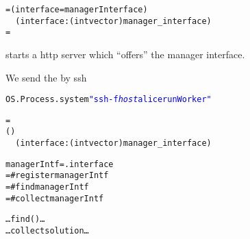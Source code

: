 \documentclass[a4,12pt]{seminar}
\begin{document}
\begin{slide}

\begin{alltt}
\footnotesize
{}  =  ( interface = managerInterface)
                \cdi{:>} \,\,( interface : (int vector) manager_interface)
     =  
\end{alltt}

\vskip 10mm

\begin{dinglist}{\dingA}
\item {} starts a http server which ``offers'' the manager interface.

\item We send the  by ssh
\end{dinglist}

\begin{alltt}
OS.Process.system \textcolor{blue}{"ssh -f \textit{host} alicerun Worker "}
\end{alltt}

\end{slide}



\begin{slide}

\begin{alltt}
\footnotesize
{}
  =
          ( )
           \cdi{:} \,\,( interface : (int vector) manager_interface)

 managerIntf = .interface
     = #{register} managerIntf
         = #{find} managerIntf
      = #{collect} managerIntf

\ldots find () \ldots
\ldots collect solution \ldots
\end{alltt}
\end{slide}
\end{document}

